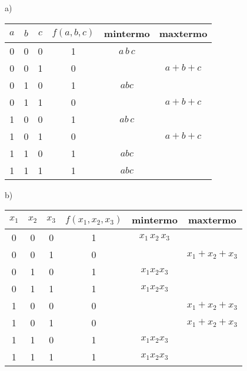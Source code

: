 \begin{minipage}[ht]{.5\linewidth}
  a)\\
  \begin{tabular}[ht]{ccc|c|c|c}
    $a$ & $b$ & $c$ & $f(a,b,c)$ & mintermo & maxtermo\\\hline
    0 & 0 & 0 & 1  & $\!a\,\!b\,\!c$ & \\
    0 & 0 & 1 & 0 & & $a+b+\!c$\\
    0 & 1 & 0 & 1 & $\!ab\!c$ &\\
    0 & 1 & 1 & 0 & & $a+\!b+\!c$\\
    1 & 0 & 0 & 1 & $a\!b\,\!c$&\\
    1 & 0 & 1 & 0 & & $\!a+b+\!c$\\
    1 & 1 & 0 & 1 & $ab\!c$&\\
    1 & 1 & 1 & 1 & $abc$ &\\
  \end{tabular}
\end{minipage}
\begin{minipage}[ht]{.5\linewidth}
  b)\\\def\x{x_1}\def\y{x_2}\def\z{x_3}
  \begin{tabular}[ht]{ccc|c|c|c}
    $\x$ & $\y$ & $\z$ & $f(\x,\y,\z)$ & mintermo & maxtermo\\\hline
    0 & 0 & 0 & 1 & $\!\x\,\!\y\,\!\z$&\\
    0 & 0 & 1 & 0 & & $\x + \y + \!\z$\\
    0 & 1 & 0 & 1 & $\!\x\y\!\z$ &\\
    0 & 1 & 1 & 1 & $\!\x\y\z$ &\\
    1 & 0 & 0 & 0 & & $\!\x+\y+\z$\\
    1 & 0 & 1 & 0 & & $\!\x+\y+\!\z$ \\
    1 & 1 & 0 & 1 & $\x\y\!\z$&\\
    1 & 1 & 1 & 1 & $\x\y\z$ &\\
  \end{tabular}
\end{minipage}

\bigskip\exercise\smallskip

